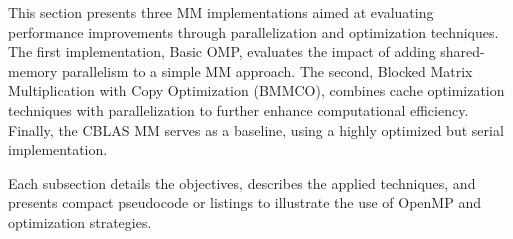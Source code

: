 

This section presents three MM implementations aimed at evaluating performance improvements through parallelization and optimization techniques. The first implementation, Basic OMP, evaluates the impact of adding shared-memory parallelism to a simple MM approach. The second, Blocked Matrix Multiplication with Copy Optimization (BMMCO), combines cache optimization techniques with parallelization to further enhance computational efficiency. Finally, the CBLAS MM serves as a baseline, using a highly optimized but serial implementation.

Each subsection details the objectives, describes the applied techniques, and presents compact pseudocode or listings to illustrate the use of OpenMP and optimization strategies.